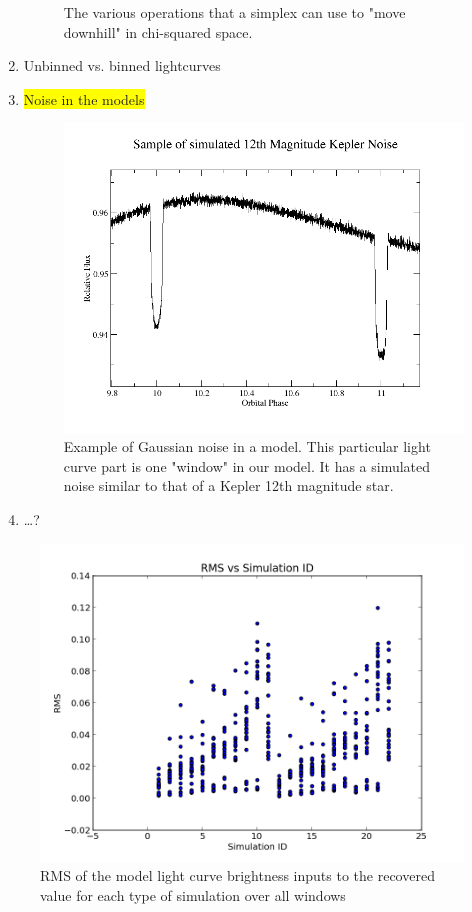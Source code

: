 \documentclass[iop]{emulateapj}
\newcommand{\hilight}[1]{\colorbox{yellow}{#1}}
\begin{document}
\begin{enumerate}
\begin{figure}[h]
				\caption{The various operations that a simplex can use to "move downhill" in chi-squared space.}
				\label{simplex}
			\end{figure}
		\item Unbinned vs. binned lightcurves
		\item \hilight{Noise in the models}
			\begin{figure}[h]
				\centering
				\includegraphics[width=.5\textwidth]{images/12_noise.png}
				\caption{Example of Gaussian noise in a model. This particular light curve part is one "window" in our model. It has a simulated noise similar to that of a Kepler 12th magnitude star.}
				\label{noise}
			\end{figure}
		\item \ldots?
	\end{enumerate}
	
\begin{figure}[h]
	\centering
	\includegraphics[width=.5\textwidth]{images/rms_over_time.png}
	\caption{RMS of the model light curve brightness inputs to the recovered value for each type of simulation over all windows}
	\label{RMS}
\end{figure}
	
\end{document}
